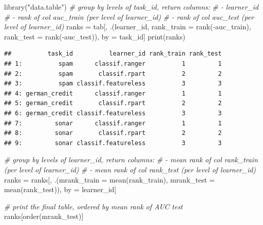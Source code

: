 \documentclass[
]{scrbook}
\newenvironment{Shaded}{\begin{snugshade}}{\end{snugshade}}
\newcommand{\AttributeTok}[1]{\textcolor[rgb]{0.77,0.63,0.00}{#1}}
\newcommand{\CommentTok}[1]{\textcolor[rgb]{0.56,0.35,0.01}{\textit{#1}}}
\newcommand{\FunctionTok}[1]{\textcolor[rgb]{0.00,0.00,0.00}{#1}}
\newcommand{\NormalTok}[1]{#1}
\newcommand{\OtherTok}[1]{\textcolor[rgb]{0.56,0.35,0.01}{#1}}
\newcommand{\SpecialCharTok}[1]{\textcolor[rgb]{0.00,0.00,0.00}{#1}}
\newcommand{\StringTok}[1]{\textcolor[rgb]{0.31,0.60,0.02}{#1}}
\renewenvironment{Shaded} {\begin{snugshade}\small} {\end{snugshade}}
\begin{document}
\begin{Shaded}
\begin{Highlighting}[]
\FunctionTok{library}\NormalTok{(}\StringTok{"data.table"}\NormalTok{)}
\CommentTok{\# group by levels of task\_id, return columns:}
\CommentTok{\# {-} learner\_id}
\CommentTok{\# {-} rank of col \textquotesingle{}{-}auc\_train\textquotesingle{} (per level of learner\_id)}
\CommentTok{\# {-} rank of col \textquotesingle{}{-}auc\_test\textquotesingle{} (per level of learner\_id)}
\NormalTok{ranks }\OtherTok{=}\NormalTok{ tab[, .(learner\_id, }\AttributeTok{rank\_train =} \FunctionTok{rank}\NormalTok{(}\SpecialCharTok{{-}}\NormalTok{auc\_train), }\AttributeTok{rank\_test =} \FunctionTok{rank}\NormalTok{(}\SpecialCharTok{{-}}\NormalTok{auc\_test)), by }\OtherTok{=}\NormalTok{ task\_id]}
\FunctionTok{print}\NormalTok{(ranks)}
\end{Highlighting}
\end{Shaded}

\begin{verbatim}
##          task_id          learner_id rank_train rank_test
## 1:          spam      classif.ranger          1         1
## 2:          spam       classif.rpart          2         2
## 3:          spam classif.featureless          3         3
## 4: german_credit      classif.ranger          1         1
## 5: german_credit       classif.rpart          2         2
## 6: german_credit classif.featureless          3         3
## 7:         sonar      classif.ranger          1         1
## 8:         sonar       classif.rpart          2         2
## 9:         sonar classif.featureless          3         3
\end{verbatim}

\begin{Shaded}
\begin{Highlighting}[]
\CommentTok{\# group by levels of learner\_id, return columns:}
\CommentTok{\# {-} mean rank of col \textquotesingle{}rank\_train\textquotesingle{} (per level of learner\_id)}
\CommentTok{\# {-} mean rank of col \textquotesingle{}rank\_test\textquotesingle{} (per level of learner\_id)}
\NormalTok{ranks }\OtherTok{=}\NormalTok{ ranks[, .(}\AttributeTok{mrank\_train =} \FunctionTok{mean}\NormalTok{(rank\_train), }\AttributeTok{mrank\_test =} \FunctionTok{mean}\NormalTok{(rank\_test)), by }\OtherTok{=}\NormalTok{ learner\_id]}

\CommentTok{\# print the final table, ordered by mean rank of AUC test}
\NormalTok{ranks[}\FunctionTok{order}\NormalTok{(mrank\_test)]}
\end{Highlighting}
\end{Shaded}
\end{document}
